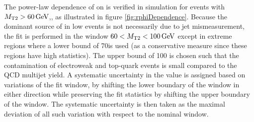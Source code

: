 The power-law dependence of \rphi on \mttwo is verified in simulation for events with $M_{\mathrm{T2}} > 60 \,\text{Ge\hspace{-.08em}V}$,, as illustrated in figure \ref{fig:rphiDependence}. Because the dominant source of \MET in low \mttwo events is not necessarily due to jet mismeasurement, the fit is performed in the window $60 < M_{\mathrm{T2}} < 100 \,\text{Ge\hspace{-.08em}V}$ except in extreme \HT regions where a lower bound of 70\GeV is used (as a conservative measure since these regions have high statistics). The upper bound of 100 \GeV is chosen such that the contamination of electroweak and top-quark events is small compared to the QCD multijet yield. A systematic uncertainty in the \rphi value is assigned based on variations of the fit window, by shifting the lower boundary of the window in either direction while preserving the fit statistics by shifting the upper boundary of the window. The systematic uncertainty is then taken as the maximal deviation of all such variation with respect to the nominal window.
